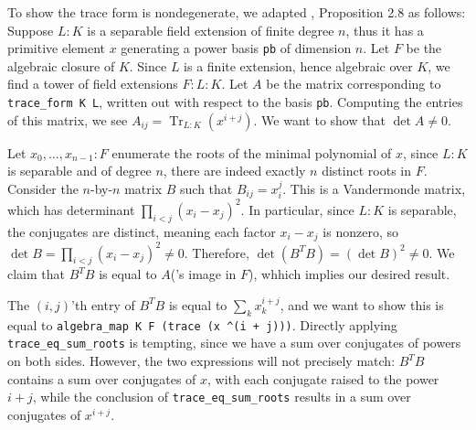 \documentclass[a4paper,USenglish,cleveref, autoref, thm-restate]{lipics-v2021}
\newcommand{\lean}[1]{\texttt{#1}\xspace} %
\DeclareMathOperator{\Tr}{\mathrm{Tr}}
\newcommand{\pow}{\textasciicircum\xspace}
\begin{document}
To show the trace form is nondegenerate, we adapted \cite{Neukirch}, Proposition 2.8 as follows:
Suppose $L : K$ is a separable field extension of finite degree $n$,
thus it has a primitive element $x$ generating a power basis \lean{pb} of dimension $n$.
Let $F$ be the algebraic closure of $K$. Since $L$ is a finite extension, hence algebraic over $K$, we find a tower of field extensions $F : L : K$.
Let $A$ be the matrix corresponding to \lean{trace\_form K L}, written out with respect to the basis \lean{pb}.
Computing the entries of this matrix, we see $A_{ij} = \Tr_{L : K} (x^{i + j})$.
We want to show that $\det A \ne 0$.

Let $x_0, \dots, x_{n - 1} : F$ enumerate the roots of the minimal polynomial of $x$,
since $L : K$ is separable and of degree $n$, there are indeed exactly $n$ distinct roots in $F$.
Consider the $n$-by-$n$ matrix $B$ such that $B_{ij} = x_i^j$.
This is a Vandermonde matrix, which has determinant $\prod_{i < j} (x_i - x_j)^2$.
In particular, since $L : K$ is separable, the conjugates are distinct, meaning each factor $x_i - x_j$ is nonzero,
so $\det B = \prod_{i < j} (x_i - x_j)^2 \ne 0$.
Therefore, $\det (B^T B) = (\det B)^2 \ne 0$.
We claim that $B^T B$ is equal to $A$('s image in $F$), whhich implies our desired result.

The $(i, j)$'th entry of $B^T B$ is equal to $\sum_k x_k^{i + j}$,
and we want to show this is equal to \lean{algebra\_map K F (trace (x \pow (i + j)))}.
Directly applying \lean{trace\_eq\_sum\_roots} is tempting, since we have a sum over conjugates of powers on both sides.
However, the two expressions will not precisely match: $B^T B$ contains a sum over conjugates of $x$, with each conjugate raised to the power $i + j$,
while the conclusion of \lean{trace\_eq\_sum\_roots} results in a sum over conjugates of $x^{i + j}$.
\end{document}
